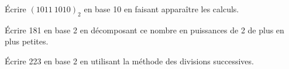 \documentclass[a4paper,12pt,eval,firamath]{nsi}
\begin{document}
\maketitle


\'Ecrire $(1011\ 1010)_2$ en base 10 en faisant apparaître les calculs.\\


\'Ecrire 181 en base 2 en décomposant ce nombre en puissances de 2 de plus en plus petites.\\


\'Ecrire 223 en base 2 en utilisant la méthode des divisions successives.\\

\end{document}

